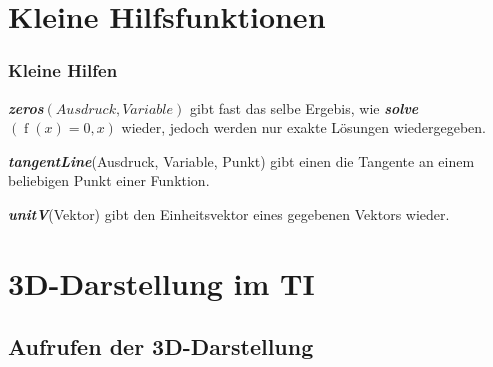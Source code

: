 \documentclass[10pt,ngerman]{beamer}
\begin{document}
\section{Kleine Hilfsfunktionen}

\begin{frame}
	\frametitle{Kleine Hilfen}

	\textbf{\textit{zeros}}\((Ausdruck, Variable)\) gibt fast das selbe Ergebis, wie \textbf{\textit{solve}}\((\operatorname{f}(x)=0, x)\) wieder, jedoch werden nur exakte Lösungen wiedergegeben. \newline

	\textbf{\textit{tangentLine}}(Ausdruck, Variable, Punkt) gibt einen die Tangente an einem beliebigen Punkt einer Funktion. \newline

	\textbf{\textit{unitV}}(Vektor) gibt den Einheitsvektor eines gegebenen Vektors wieder.

\end{frame}

\section{3D-Darstellung im TI}

\subsection{Aufrufen der 3D-Darstellung}
\end{document}
